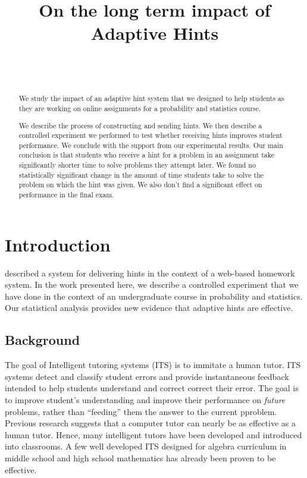 \documentclass{sigchi/sigchi}
\title{On the long term impact of Adaptive Hints}
\author{
  \alignauthor{Zhen Zhai\\
    \affaddr{UC San Diego}\\
    \email{zzhai@eng.ucsd.edu}}\\
  \alignauthor{Yoav Freund\\
    \affaddr{UC San Diego}\\
    \email{yfreund@eng.ucsd.edu}}\\
}
\begin{document}
\maketitle


\begin{abstract}

We study the impact of an adaptive hint system that we designed to help students as they are working on online assignments for a probability and statistics course.

We describe the process of constructing and sending hints. We then describe a controlled experiment we performed to test whether receiving hints improves student performance. We conclude with the support from our experimental results. Our main conclusion is that students who receive a hint for a problem in an assignment take significantly shorter time to solve problems they attempt later. We found no statistically significant change in the amount of time students take to solve the problem on which the hint was given. We also don't find a significant effect on performance in the final exam.

\end{abstract}


\section*{Introduction}

\cite{ElkherjFreund14} described a system for delivering hints in the context of a web-based homework system. In the work presented here, we describe a controlled experiment that we have done in the context of an undergraduate course in probability and statistics. Our statistical analysis provides new evidence that adaptive hints are effective.


\subsection*{Background}
The goal of Intelligent tutoring systems (ITS)\cite{Anderson1995} is
to immitate a human tutor.  ITS systems detect and classify student
errors and provide instantaneous feedback intended to help students
understand and correct correct their error. The goal is to improve
student's understanding and improve their performance on {\em future}
problems, rather than ``feeding'' them the answer to the current
pproblem.  Previous research suggests that a computer tutor can nearly
be as effective as a human tutor\cite{Vanlehn2011}. Hence, many
intelligent tutors have been developed and introduced into
classrooms. A few well developed ITS designed for algebra curriculum
in middle school and high school mathematics has already been proven
to be effective\cite{Koedinger1997,John2014}.
\end{document}
